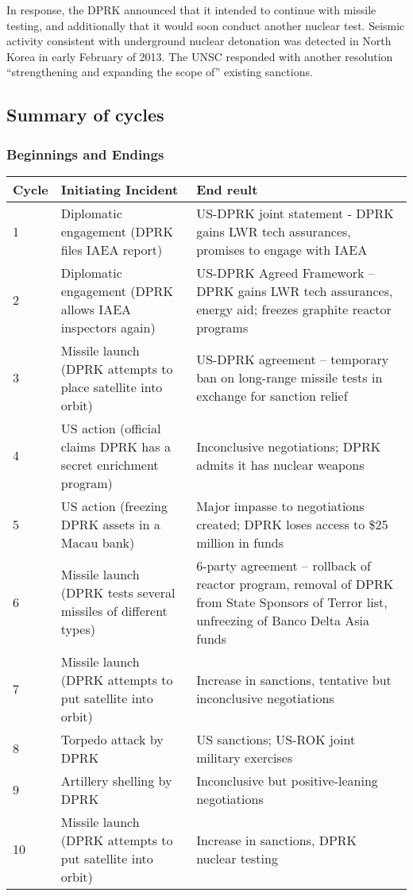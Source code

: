 \documentclass{article}
\begin{document}
In response, the DPRK announced that it intended to continue with missile testing, and additionally that it would soon conduct another nuclear test\cite{davenport}. Seismic activity consistent with underground nuclear detonation was detected in North Korea in early February of 2013\cite{davenport}. The UNSC responded with another resolution “strengthening and expanding the scope of” existing sanctions\cite{unsc13m}.

\subsection{Summary of cycles}
\subsubsection{Beginnings and Endings}
\begin{tabular}{|l|p{6cm}|p{6cm}|}
	\hline
	Cycle & Initiating Incident & End reult \\ 
	\hline
	1 & Diplomatic engagement (DPRK files IAEA report) & US-DPRK joint statement - DPRK gains LWR tech assurances, promises to engage with IAEA \\ 
	\hline
	2 & Diplomatic engagement (DPRK allows IAEA inspectors again) & US-DPRK Agreed Framework – DPRK gains LWR tech assurances, energy aid; freezes graphite reactor programs \\ 
	\hline
	3 & Missile launch (DPRK attempts to place satellite into orbit) & US-DPRK agreement – temporary ban on long-range missile tests in exchange for sanction relief \\ 
	\hline
	4 & US action (official claims DPRK has a secret enrichment program) & Inconclusive negotiations; DPRK admits it has nuclear weapons \\ 
	\hline
	5 & US action (freezing DPRK assets in a Macau bank) & Major impasse to negotiations created; DPRK loses access to \$25 million in funds \\ 
	\hline
	6 & Missile launch (DPRK tests several missiles of different types) & 6-party agreement – rollback of reactor program, removal of DPRK from State Sponsors of Terror list, unfreezing of Banco Delta Asia funds \\ 
	\hline
	7 & Missile launch (DPRK attempts to put satellite into orbit) & Increase in sanctions, tentative but inconclusive negotiations \\ 
	\hline
	8 & Torpedo attack by DPRK & US sanctions; US-ROK joint military exercises \\ 
	\hline
	9 & Artillery shelling by DPRK & Inconclusive but positive-leaning negotiations \\ 
	\hline
	10 & Missile launch (DPRK attempts to put satellite into orbit) & Increase in sanctions, DPRK nuclear testing \\
	\hline
	\end{tabular}
\end{document}
